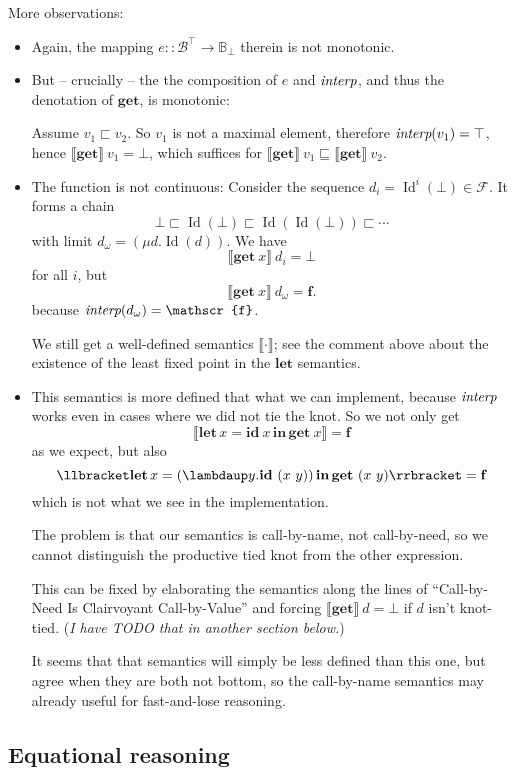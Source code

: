 \documentclass[manuscript,screen,acmsmall,nonacm]{acmart}
\newcommand{\syntax}[1]{\mathbf{#1}}
\newcommand{\slambda}{\syntax{\lambdaup}}
\newcommand{\sLet}[3]{\syntax{let}\,#1=#2\,\syntax{in}\,#3}
\newcommand{\sGet}{\syntax{get}}
\newcommand{\sId}{\syntax{id}}
\newcommand{\dBool}{\mathbb B}
\newcommand{\dFalse}{\mathbf{f}}
\newcommand{\rBool}{\mathscr B}
\newcommand{\rFalse}{\mathscr{f}}
\newcommand{\dRBool}{\mathcal F}
\newcommand{\dId}{\operatorname{Id}}
\newcommand{\D}[1]{\llbracket #1 \rrbracket}
\begin{document}
More observations:
\begin{itemize}
\item Again, the mapping $e : \colon \rBool^\top \to \dBool_\bot$ therein is not monotonic.
\item But -- crucially -- the the composition of $e$ and $\operatorname{\textit{interp}}$, and thus the denotation of $\sGet$, is monotonic:

Assume
$v_1 \sqsubset v_2$.
So $v_1$ is not a maximal element, therefore $\operatorname{\textit{interp}}(v_1) = \top$, hence $\D{\sGet}~v_1 = \bot$, which suffices for
$\D{\sGet} ~ v_1  \sqsubseteq \D{\sGet} ~ v_2$.

\item The function is not continuous: Consider the sequence $d_i = \dId^i(\bot) \in \dRBool$. It forms a chain
\[
\bot
\sqsubset \dId(\bot)
\sqsubset \dId(\dId(\bot))
\sqsubset \cdots
\]
with limit $d_\omega = (\mu d. \dId(d))$. We have
\[
\D{\sGet~x}~ d_i = \bot
\]
for all $i$, but
\[
\D{\sGet~x}~ d_\omega = \dFalse.
\]
because $\interp(d_\omega) = \rFalse$.

We still get a well-defined semantics $\D\cdot$; see the comment above about the existence of the least fixed point in the $\syntax{let}$ semantics.

\item This semantics is more defined that what we can implement, because $\operatorname{\textit{interp}}$ works even in cases where we did not tie the knot. So we not only get
\[
\D{\sLet{x}{\sId~x}{\sGet~x}} = \dFalse
\]
as we expect, but also
\[
\D{\sLet{x}{(\slambda y. \sId~(x~y))}{\sGet~(x~y)}} = \dFalse
\]
which is not what we see in the implementation.

The problem is that our semantics is call-by-name, not call-by-need, so we cannot distinguish the productive tied knot from the other expression.

This can be fixed by elaborating the semantics along the lines of “Call-by-Need Is Clairvoyant Call-by-Value” and forcing  $\D{\sGet}~d = \bot$ if $d$ isn't knot-tied.
(\emph{I have TODO that in another section below.})

It seems that that semantics will simply be less defined than this one, but agree when they are both not bottom, so the call-by-name semantics may already useful for fast-and-lose reasoning.

\end{itemize}

\subsection{Equational reasoning}
\end{document}
